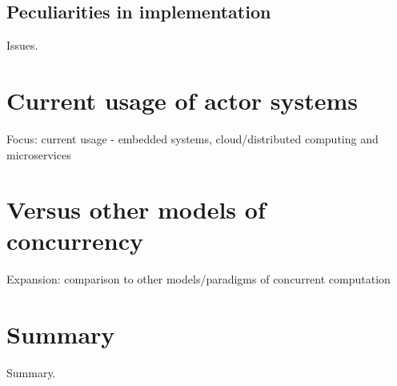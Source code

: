 \documentclass[A4]{article}
\begin{document}
\subsection{Peculiarities in implementation}
Issues.

\section{Current usage of actor systems}
Focus: current usage - embedded systems, cloud/distributed computing and microservices

\section{Versus other models of concurrency}
Expansion: comparison to other models/paradigms of concurrent computation

\section{Summary}
\label{summary}
Summary.

\nocite{robotron,
stonx,vice,650sim,herculessim,zib,4004,thermal1,thermal2,rojas}




\end{document}
